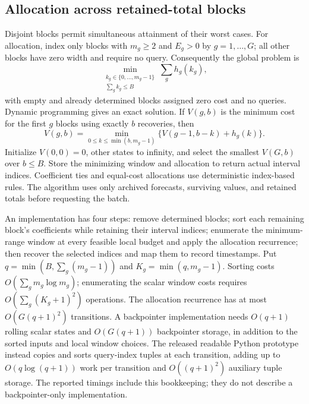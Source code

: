 \documentclass[12pt]{article}
\begin{document}
\subsection{Allocation across retained-total blocks}
Disjoint blocks permit simultaneous attainment of their worst cases.
For allocation, index only blocks with $m_g\geq2$ and $E_g>0$ by
$g=1,\ldots,G$; all other blocks have zero width and require no query.
Consequently the global problem is
\begin{equation}
 \min_{\substack{k_g\in\{0,\ldots,m_g-1\}\\\sum_g k_g\leq B}}
 \sum_g h_g(k_g),
 \label{eq:allocation}
\end{equation}
with empty and already determined blocks assigned zero cost and no queries.
Dynamic programming gives an exact solution. If $V(g,b)$ is the minimum
cost for the first $g$ blocks using exactly $b$ recoveries, then
\begin{equation}
 V(g,b)=\min_{0\leq k\leq\min(b,m_g-1)}
 \{V(g-1,b-k)+h_g(k)\}.
\end{equation}
Initialize $V(0,0)=0$, other states to infinity, and select the smallest
$V(G,b)$ over $b\leq B$. Store the minimizing window and allocation to
return actual interval indices. Coefficient ties and equal-cost allocations
use deterministic index-based rules. The algorithm uses only archived
forecasts, surviving values, and retained totals before requesting the batch.

An implementation has four steps: remove determined blocks; sort each
remaining block's coefficients while retaining their interval indices;
enumerate the minimum-range window at every feasible local budget and
apply the allocation recurrence; then recover the selected indices and
map them to record timestamps. Put $q=\min(B,\sum_g(m_g-1))$ and
$K_g=\min(q,m_g-1)$. Sorting costs
$O(\sum_g m_g\log m_g)$; enumerating the scalar window costs requires
$O(\sum_g(K_g+1)^2)$ operations. The allocation recurrence has at most
$O(G(q+1)^2)$ transitions. A backpointer implementation needs $O(q+1)$
rolling scalar states and $O(G(q+1))$ backpointer storage, in addition to
the sorted inputs and local window choices. The released readable Python
prototype instead copies and sorts query-index tuples at each transition,
adding up to $O(q\log(q+1))$ work per transition and $O((q+1)^2)$
auxiliary tuple storage. The reported timings include this bookkeeping;
they do not describe a backpointer-only implementation.
\end{document}
